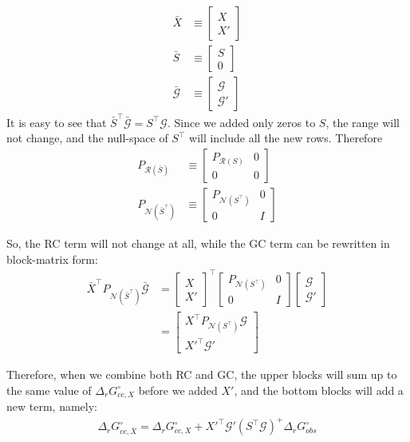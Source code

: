 \documentclass[twocolumn]{article}
\newcommand{\Gmat}{\mathcal{G}}
\newcommand{\PRmat}[1]{P_{\mathcal{R}\left(#1\right)}}
\newcommand{\PNmat}[1]{P_{\mathcal{N}\left(#1\right)}}
\begin{document}
\begin{align*}
	\bar{X} & \equiv \begin{bmatrix} X \\ X' \end{bmatrix} \\
	\bar{S} & \equiv \begin{bmatrix} S \\ 0 \end{bmatrix} \\
	\bar{\Gmat} & \equiv \begin{bmatrix} \Gmat \\ \Gmat'\end{bmatrix}
\end{align*}
It is easy to see that $\bar{S}^\top \bar{\Gmat} = S^\top \Gmat$. Since we added only zeros to $S$, the range will not change, and the null-space of $S^\top$ will include all the new rows. Therefore
\begin{align}
	\PRmat{\bar{S}} & \equiv \begin{bmatrix}\PRmat{S} & 0 \\ 0 & 0 \end{bmatrix}  \\
	\PNmat{\bar{S}^\top} & \equiv \begin{bmatrix} \PNmat{S^\top} & 0 \\ 0 & I \end{bmatrix}
\end{align}

So, the RC term will not change at all, while the GC term can be rewritten in block-matrix form:
\begin{align}\label{eq:P_N_ST_G}
\bar{X}^\top \PNmat{\bar{S}^\top} \bar{\Gmat} &=
\begin{bmatrix} X \\ X' \end{bmatrix}^\top \begin{bmatrix} \PNmat{S^\top} & 0 \\ 0 & I \end{bmatrix}
\begin{bmatrix} \Gmat \\ \Gmat'\end{bmatrix} \nonumber\\
 &= \begin{bmatrix}X^\top \PNmat{S^\top} \Gmat \\ X'^\top \Gmat' \end{bmatrix}
\end{align}

Therefore, when we combine both RC and GC, the upper blocks will sum up to the same value of $\Delta_{r}G_{cc,X}^{\circ}$ before we added $X'$, and the bottom blocks will add a new term, namely:
\begin{align}
    \Delta_{r}G_{cc,\bar{X}}^{\circ} = \Delta_{r}G_{cc,X}^{\circ} + X'^\top \Gmat' \left(S^{\top}\Gmat\right)^{+} \Delta_{r}G_{obs}^{\circ}
\end{align}
\end{document}
